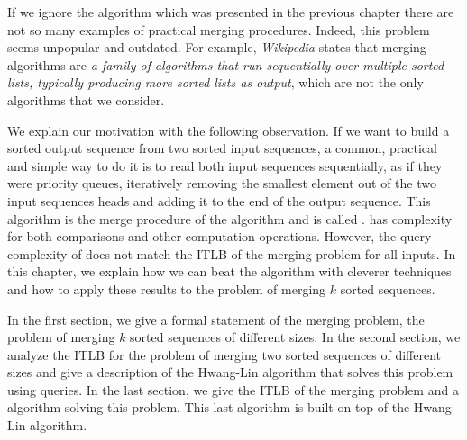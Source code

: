 \label{tree:merging:intro}

If we ignore the \mergesort algorithm which was presented in
the previous chapter there are not so many examples of practical merging
procedures. Indeed, this problem seems unpopular and outdated. For example,
\emph{Wikipedia} states that merging algorithms are \emph{a family of algorithms
that run sequentially over multiple sorted lists, typically producing more
sorted lists as output}, which are not the only algorithms that we
consider.

We explain our motivation with the following observation.
If we want to build a sorted output sequence from two sorted input sequences, a
common, practical and simple way to do it is to read both input sequences
sequentially, as if they were priority queues, iteratively removing the
smallest element out of the two input sequences heads and adding it to the end
of the output sequence. This algorithm is the merge procedure of the \mergesort
algorithm and is called \tapemerge. \tapemerge has  complexity for
both comparisons and other computation operations. However, the query
complexity of \tapemerge does not match the ITLB of the merging problem for all
inputs. In this chapter, we explain how we can beat the \tapemerge algorithm
with cleverer techniques and how to apply these results to the problem of
merging \(k\) sorted sequences.

In the first section, we give a formal statement of the merging problem, \ie
the problem of merging \(k\) sorted sequences of different sizes. In the second
section, we analyze the ITLB for the problem of merging two sorted sequences of
different sizes and give a description of the Hwang-Lin algorithm
\cite{DBLP:journals/siamcomp/HwangL72} that solves this problem using
 queries. In the last section, we give the ITLB of the merging
problem and a  algorithm solving this problem. This last
algorithm is built on top of the Hwang-Lin algorithm.
